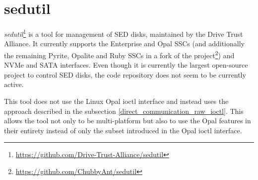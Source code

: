 
\section{sedutil}

\emph{sedutil}\footnote{\url{https://github.com/Drive-Trust-Alliance/sedutil}} is a tool for management of SED disks, maintained by the Drive Trust Alliance.
It currently supports the Enterprise and Opal SSCs (and additionally the remaining Pyrite, Opalite and Ruby SSCs in a fork of the project\footnote{\url{https://github.com/ChubbyAnt/sedutil}}) and NVMe and SATA interfaces.
Even though it is currently the largest open-source project to control SED disks, the code repository does not seem to be currently active.

This tool does not use the Linux Opal ioctl interface and instead uses the approach described in the subsection \ref{direct_communication_raw_ioctl}. This allows the tool not only to be multi-platform but also to use the Opal features in their entirety instead of only the subset introduced in the Opal ioctl interface.

